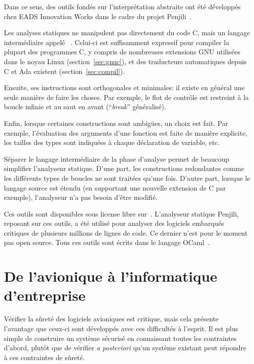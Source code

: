 Dans ce sens, des outils fondés sur l'interprétation abstraite ont été
développés chez EADS Innovation Works dans le cadre du projet
Penjili~\cite{AllamigeonHymansSSTIC07}.

Les analyses statiques ne manipulent pas directement du code C, mais un langage
intermédiaire appelé \newspeak~\cite{newspeak}. Celui-ci est suffisamment
expressif pour compiler la plupart des programmes C, y compris de nombreuses
extensions GNU utilisées dans le noyau Linux (section~\ref{sec:gnuc}), et des
traducteurs automatiques depuis C et Ada existent (section~\ref{sec:compil}).

Ensuite, ses instructions sont orthogonales et minimales: il existe en général
une seule manière de faire les choses. Par exemple, le flot de contrôle est
restreint à la boucle infinie et au saut en avant (\enquote{\emph{break}}
généralisé).

Enfin, lorsque certaines constructions sont ambigües, un choix est fait. Par
exemple, l'évaluation des arguments d'une fonction est faite de manière
explicite, les tailles des types sont indiquées à chaque déclaration de
variable, etc.

Séparer le langage intermédiaire de la phase d'analyse permet de beaucoup
simplifier l'analyseur statique. D'une part, les constructions redondantes comme
les différents types de boucles ne sont traitées qu'une fois. D'autre part,
lorsque le langage source est étendu (en supportant une nouvelle extension de C
par exemple), l'analyseur n'a pas besoin d'être modifié.

Ces outils sont disponibles sous license libre sur~. L'analyseur
statique Penjili, reposant sur ces outils, a été utilisé pour analyser des
logiciels embarqués critiques de plusieurs millions de lignes de code. Ce
dernier n'est pour le moment pas open source. Tous ces outils sont écrits dans
le langage OCaml~\cite{DAOC}.

\section{De l'avionique à l'informatique d'entreprise}

Vérifier la sûreté des logiciels avioniques est critique, mais cela présente
l'avantage que ceux-ci sont développés avec ces difficultés à l'esprit. Il est
plus simple de construire un système sécurisé en connaissant toutes les
contraintes d'abord, plutôt que de vérifier \emph{a posteriori} qu'un système
existant peut répondre à ces contraintes de sûreté.

